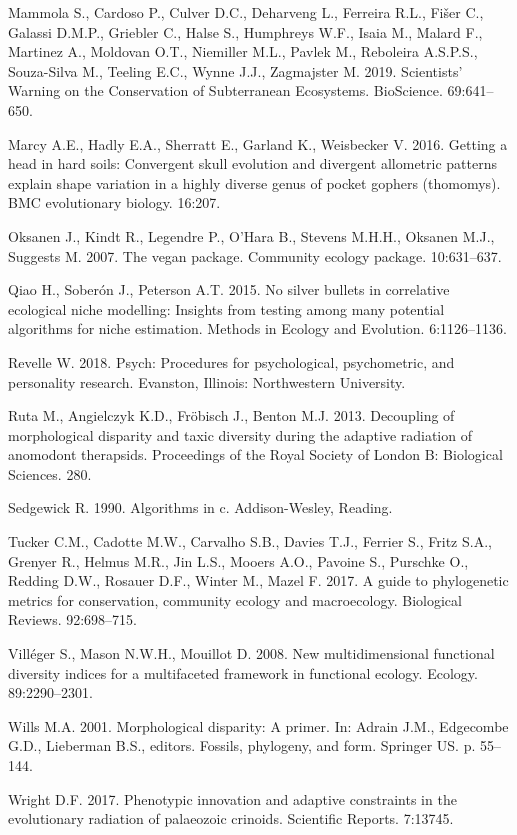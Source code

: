\documentclass[]{article}
\begin{document}
\hypertarget{ref-mammola2019b}{}
Mammola S., Cardoso P., Culver D.C., Deharveng L., Ferreira R.L., Fišer
C., Galassi D.M.P., Griebler C., Halse S., Humphreys W.F., Isaia M.,
Malard F., Martinez A., Moldovan O.T., Niemiller M.L., Pavlek M.,
Reboleira A.S.P.S., Souza-Silva M., Teeling E.C., Wynne J.J., Zagmajster
M. 2019. Scientists' Warning on the Conservation of Subterranean
Ecosystems. BioScience. 69:641--650.

\hypertarget{ref-marcy2016}{}
Marcy A.E., Hadly E.A., Sherratt E., Garland K., Weisbecker V. 2016.
Getting a head in hard soils: Convergent skull evolution and divergent
allometric patterns explain shape variation in a highly diverse genus of
pocket gophers (thomomys). BMC evolutionary biology. 16:207.

\hypertarget{ref-oksanen2007vegan}{}
Oksanen J., Kindt R., Legendre P., O'Hara B., Stevens M.H.H., Oksanen
M.J., Suggests M. 2007. The vegan package. Community ecology package.
10:631--637.

\hypertarget{ref-qiao2015}{}
Qiao H., Soberón J., Peterson A.T. 2015. No silver bullets in
correlative ecological niche modelling: Insights from testing among many
potential algorithms for niche estimation. Methods in Ecology and
Evolution. 6:1126--1136.

\hypertarget{ref-psych}{}
Revelle W. 2018. Psych: Procedures for psychological, psychometric, and
personality research. Evanston, Illinois: Northwestern University.

\hypertarget{ref-ruta2013}{}
Ruta M., Angielczyk K.D., Fröbisch J., Benton M.J. 2013. Decoupling of
morphological disparity and taxic diversity during the adaptive
radiation of anomodont therapsids. Proceedings of the Royal Society of
London B: Biological Sciences. 280.

\hypertarget{ref-sedgewick1990}{}
Sedgewick R. 1990. Algorithms in c. Addison-Wesley, Reading.

\hypertarget{ref-tucker2017}{}
Tucker C.M., Cadotte M.W., Carvalho S.B., Davies T.J., Ferrier S., Fritz
S.A., Grenyer R., Helmus M.R., Jin L.S., Mooers A.O., Pavoine S.,
Purschke O., Redding D.W., Rosauer D.F., Winter M., Mazel F. 2017. A
guide to phylogenetic metrics for conservation, community ecology and
macroecology. Biological Reviews. 92:698--715.

\hypertarget{ref-villuxe9ger2008}{}
Villéger S., Mason N.W.H., Mouillot D. 2008. New multidimensional
functional diversity indices for a multifaceted framework in functional
ecology. Ecology. 89:2290--2301.

\hypertarget{ref-wills2001}{}
Wills M.A. 2001. Morphological disparity: A primer. In: Adrain J.M.,
Edgecombe G.D., Lieberman B.S., editors. Fossils, phylogeny, and form.
Springer US. p. 55--144.

\hypertarget{ref-wright2017}{}
Wright D.F. 2017. Phenotypic innovation and adaptive constraints in the
evolutionary radiation of palaeozoic crinoids. Scientific Reports.
7:13745.
\end{document}
